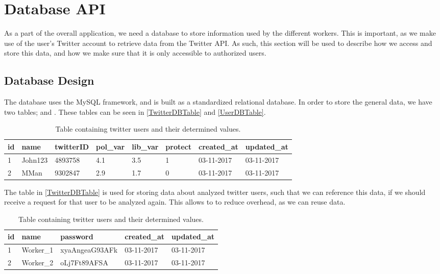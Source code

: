 \chapter{Database API}
As a part of the overall application, we need a database to store information
used by the different workers. This is important, as we make use of the
user's Twitter account to retrieve data from the Twitter API. As such, this
section will be used to describe how we access and store this data, and how we
make sure that it is only accessible to authorized users.

\section{Database Design}\label{DBDesign}
The database uses the MySQL framework, and is built as a standardized relational
database. In order to store the general data, we have two tables; 
and . These tables can be seen in \autoref{TwitterDBTable}
and \autoref{UserDBTable}.

\begin{table}[H]
\begin{tabular}{l | l | l | l | l | l | l | l	}
\textbf{id} & \textbf{name} & \textbf{twitterID} & \textbf{pol\_var} &
\textbf{lib\_var} & \textbf{protect} & \textbf{created\_at} & \textbf{updated\_at}
\\\hline 1 & John123 & 4893758 & 4.1 & 3.5 & 1 & 03-11-2017 & 03-11-2017 
\\\hline 2 & MMan & 9302847 & 2.9 & 1.7 & 0 & 03-11-2017 & 03-11-2017 
\\\hline
\end{tabular}
\caption{Table containing twitter users and their determined values.}
\label{TwitterDBTable}
\end{table}

The table in \autoref{TwitterDBTable} is used for storing data about analyzed
twitter users, such that we can reference this data, if we should receive
a request for that user to be analyzed again. This allows to to reduce overhead,
as we can reuse data.

\begin{table}[H]
\begin{tabular}{l | l | l | l | l }
\textbf{id} & \textbf{name} & \textbf{password} &
\textbf{created\_at} & \textbf{updated\_at}\\\hline
1 & Worker\_1 & xyaAngeaG93AFk & 03-11-2017 & 03-11-2017
\\\hline
2 & Worker\_2 & oLj7Ft89AFSA & 03-11-2017 & 03-11-2017 \\\hline
\end{tabular}
\caption{Table containing twitter users and their determined values.}
\label{UserDBTable}
\end{table}


